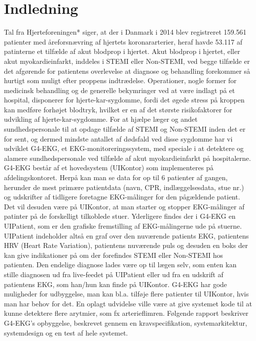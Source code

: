 \chapter{Indledning}
Tal fra Hjerteforeningen* siger, at der i Danmark i 2014 blev registreret 159.561 patienter med åreforsnævring af hjertets koronararterier, heraf havde 53.117 af patinterne et tilfælde af akut blodprop i hjertet. Akut blodprop i hjertet, eller akut myokardieinfarkt, inddeles i STEMI eller Non-STEMI, ved begge tilfælde er det afgørende for patientens overlevelse at diagnose og behandling forekommer så hurtigt som muligt efter proppens indtrædelse.
Operationer, nogle former for medicinsk behandling og de generelle bekymringer ved at være indlagt på et hospital, disponerer for hjerte-kar-sygdomme, fordi det øgede stress på kroppen kan medføre forhøjet blodtryk, hvilket er en af det største risikofaktorer for udvikling af hjerte-kar-sygdomme.
For at hjælpe læger og andet sundhedspersonale til at opdage tilfælde af STEMI og Non-STEMI inden det er for sent, og dermed mindste antallet af dødsfald ved disse sygdomme har vi udviklet G4-EKG, et EKG-monitoreringssystem, med speciale i at detektere og alamere sundhedspersonale ved tilfælde af akut myokardieinfarkt på hospitalerne. 
G4-EKG består af et hovedsystem (UIKontor) som implementeres på afdelingskontoret. Herpå kan man se data for op til 6 patienter af gangen, herunder de mest primære patientdata (navn, CPR, indlæggelsesdata, stue nr.) og udskrifter af tidligere foretagne EKG-målinger for den pågældende patient. Det vil desuden være på UIKontor, at man starter og stopper EKG-målinger af patinter på de forskelligt tilkoblede stuer. 
Yderligere findes der i G4-EKG en UIPatient, som er den grafiske fremstilling af EKG-målingerne ude på stuerne. UIPatient indeholder altså en graf over den nuværende patients EKG, patientens HRV (Heart Rate Variation), patientens nuværende puls og desuden en boks der kan give indikationer på om der forefindes STEMI eller Non-STEMI hos patienten. Den endelige diagnose lades være op til lægen selv, som enten kan stille diagnosen ud fra live-feedet på UIPatient eller ud fra en udskrift af patientens EKG, som han/hun kan finde på UIKontor. 
G4-EKG har gode muligheder for udbyggelse, man kan bl.a. tilføje flere patienter til UIKontor, hvis man har behov for det. En oplagt udvidelse ville være at give systemet kode til at kunne detektere flere arytmier, som fx arterieflimren. 
Følgende rapport beskriver G4-EKG’s opbyggelse, beskrevet gennem en kravspecifikation, systemarkitektur, systemdesign og en test af hele systemet. 